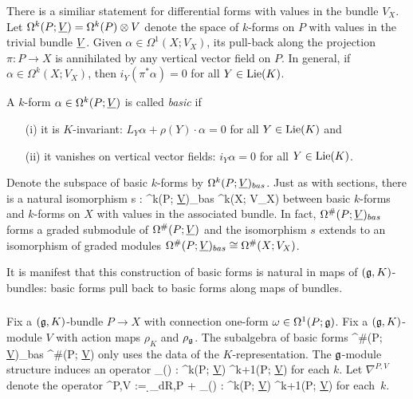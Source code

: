 There is a similiar statement for differential forms with values in the bundle $V_X$. Let $\Omega^k(P ; \underline{V}) = \Omega^k(P) \otimes V$ denote the space of $k$-forms on $P$ with values in the trivial bundle $\underline{V}$. Given $\alpha \in \Omega^1(X ; V_X)$, its pull-back along the projection $\pi: P \to X$ is annihilated by any vertical vector field on $P$. In general, if $\alpha \in \Omega^k(X; V_X)$, then $i_Y(\pi^*\alpha) = 0$ for all $Y \in {\rm Lie}(K)$.

\begin{dfn} A $k$-form $\alpha \in \Omega^k(P; \underline{V})$ is called {\em basic} if 
\begin{itemize}
\item[(i)] it is $K$-invariant: $L_Y \alpha + \rho(Y) \cdot \alpha = 0 $ for all $Y \in {\rm Lie}(K)$ and
\item[(ii)] it vanishes on vertical vector fields: $i_Y \alpha = 0$ for all $Y \in {\rm Lie}(K)$. 
\end{itemize}
\end{dfn}

Denote the subspace of basic $k$-forms by $\Omega^k(P; \underline{V})_{bas}$. Just as with sections, there is a natural isomorphism
\ben
s : \Omega^k(P; \ul{V})_{bas} \xto{\cong} \Omega^k(X; V_X) 
\een
between basic $k$-forms and $k$-forms on $X$ with values in the associated bundle.
In fact, $\Omega^{\#}(P; \underline{V})_{bas}$ forms a graded submodule of $\Omega^{\#}(P; \underline{V})$ and the isomorphism $s$ extends to an isomorphism of graded modules $\Omega^{\#}(P; \underline{V})_{bas} \cong \Omega^{\#}(X; V_X)$.

It is manifest that this construction of basic forms is natural in maps of $(\mathfrak g,K)$-bundles: basic forms pull back to basic forms along maps of bundles.

\subsubsection{}

Fix a $(\mathfrak g,K)$-bundle $P \to X$ with connection one-form $\omega \in \Omega^1(P; \mathfrak g)$. Fix a $(\mathfrak g,K)$-module $V$ with action maps $\rho_K$ and $\rho_{\mathfrak g}$. The subalgebra of basic forms
\ben
\Omega^{\#}(P; \ul{V})_{bas} \subset \Omega^{\#}(P; \ul{V})
\een
only uses the data of the $K$-representation. The $\mathfrak g$-module structure induces an operator
\ben
\rho_\fg(\omega) : \Omega^k(P; \ul{V}) \to \Omega^{k+1}(P; \ul{V})
\een
for each $k$. Let $\nabla^{P,V}$ denote the operator
\ben
\nabla^{P,V} := \d_{dR,P} + \rho_\fg(\omega) : \Omega^k(P; \ul{V}) \to \Omega^{k+1}(P; \ul{V})
\een 
for each~$k$. 


